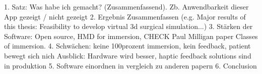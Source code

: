 1. Satz: Was habe ich gemacht? (Zusammenfassend). Zb. Anwendbarkeit dieser App gezeigt / nicht gezeigt
2. Ergebnis Zusammenfassen (e.g. Major results of this thesis: Feasibility to develop virtual 3d surgical simulation...)
3. Stärken der Software: Open source, HMD for immersion, CHECK Paul Milligan paper Classes of immersion.
4. Schwächen: keine 100prozent immersion, kein feedback, patient bewegt sich nich
            Ausblick: Hardware wird besser, haptic feedback solutions sind in produktion
5. Software einordnen in vergleich zu anderen papern
6. Conclusion